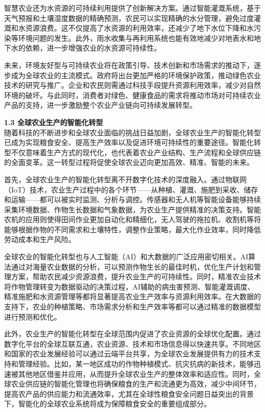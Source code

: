 智慧农业还为水资源的可持续利用提供了创新解决方案。通过智能灌溉系统，基于天气预报和土壤湿度数据的精确预测，农民可以实现精确的水分管理，避免过度灌溉和水资源浪费。这不仅提高了水资源的利用效率，还减少了地下水位下降和水污染等环境问题的发生。此外，雨水收集与再利用系统也能有效地减少对地表水和地下水的依赖，进一步增强农业的水资源可持续性。

未来，环境友好型与可持续农业将在政策引导、技术创新和市场需求的推动下，逐步成为全球农业的主流模式。政府将出台更加严格的环境保护政策，推动绿色农业技术的研究与推广。企业和农民则需通过科技手段提升资源利用效率，减少对自然环境的破坏。与此同时，消费者对绿色、健康食品的需求将推动市场对可持续农业产品的支持，进一步激励整个农业产业链向可持续发展转型。


\textbf{1.3 全球农业生产的智能化转型} \\
随着科技的不断进步和全球农业面临的挑战日益加剧，全球农业生产的智能化转型已成为实现粮食安全、提高生产效率以及促进环境可持续性的重要途径。智能化转型不仅意味着生产方式的现代化，也代表着农业产业结构、生产流程和全球供应链的全面变革。这一转型过程将促使全球农业迈向更加高效、精准、智能的未来。

首先，全球农业生产的智能化转型离不开数字化技术的深度融入。通过物联网（IoT）技术，农业生产过程中的各个环节——从种植、灌溉、施肥到采收、储存和运输——都可以被实时监测、分析与调控。传感器和无人机等智能设备能够持续采集环境数据、作物生长数据和气象数据，为农业生产提供精准的决策支持。智能农机的应用则使得田间作业更加自动化和精细化，无人驾驶的拖拉机、收割机等将能够根据作物的不同需求和土壤特性，调整作业策略，最大化作业效率，同时降低劳动成本和生产风险。

全球农业的智能化转型也与人工智能（AI）和大数据的广泛应用密切相关。AI算法通过对海量农业数据的分析，可以预测作物生长的最佳时机，优化生产计划和管理方案，帮助农民减少资源浪费，提升农业生产的可持续性。同时，精准农业技术将作物管理转变为数据驱动的决策过程，AI辅助的病虫害预测、智能灌溉调度、精准施肥和水资源管理等都将显著提高农业生产效率与资源利用效率。在大数据的支持下，农业的种植策略、市场需求分析和生产效率等都可以通过精准的数据模型进行预测和优化。

此外，农业生产的智能化转型在全球范围内促进了农业资源的全球优化配置。通过数字化平台的全球互联互通，农业资源、技术和市场信息得以快速共享。不同地区和国家的农业发展经验可以通过云端平台共享，为全球农业发展提供有力的技术支持和管理经验。比如，某一地区成功的作物种植模式、抗灾抗病的新技术，能够迅速被其他地区借鉴并应用，从而提升全球农业生产的整体效率和适应性。同时，全球农业供应链的智能化管理也将确保粮食的生产和流通更为高效，减少中间环节，提高农产品的供应能力和流通效率，尤其在全球性粮食安全问题日益突出的背景下，智能化的全球农业系统将成为保障粮食安全的重要组成部分。

